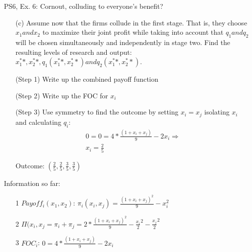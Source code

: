\begin{frame}{PS6, Ex. 6: Cornout, colluding to everyone's benefit?}
    \begin{itemize}
    \item[(c)] Assume now that the firms collude in the first stage. That is, they choose $x_1 and x_2$ to maximize their joint profit while taking into account that $q_1 and q_2$ will be chosen simultaneously and independently in stage two. Find the resulting levels of research and output: $x_1^**,x_2^**,q_1(x_1^**,x_2^**) and q_2(x_1^**,x_2^**)$.
    \end{itemize}
    \vfill\null
  \begin{multicols}{2}
    \begin{itemize}
      \item[(Step 1)] Write up the combined payoff function
      \item[(Step 2)] Write up the FOC for $x_i$
      \item[(Step 3)] Use symmetry to find the outcome by setting $x_i=x_j$ isolating $x_i$ and calculating $q_i$:
      \begin{align*}
          0 = 0=4*\frac{(1+x_i+x_j)}{9}-2x_i \Rightarrow \\ x_i=\frac{2}{5}
      \end{align*}
      \item[Outcome:] \begin{math} \left(\frac{2}{5},\frac{2}{5},\frac{3}{5},\frac{3}{5}\right)\end{math}
    \end{itemize}
    \vfill\null \columnbreak
    Information so far:
    \begin{itemize}
    \item[1] $Payoff_i(x_1,x_2)$: $\pi_i(x_i,x_j) = \frac{(1+x_i+x_j)^2}{9}-x_i^2 $ 
    \item[2] $\Pi(x_i,x_j= \pi_i + \pi_j = 2*\frac{(1+x_i+x_j)^2}{9}-\frac{x_i}{2}^2-\frac{x_j}{2}^2 $ 
    \item[3] $FOC_i$: $0=4*\frac{(1+x_i+x_j)}{9}-2x_i$ 
    \end{itemize}
    \vfill\null
  \end{multicols}
\end{frame}


